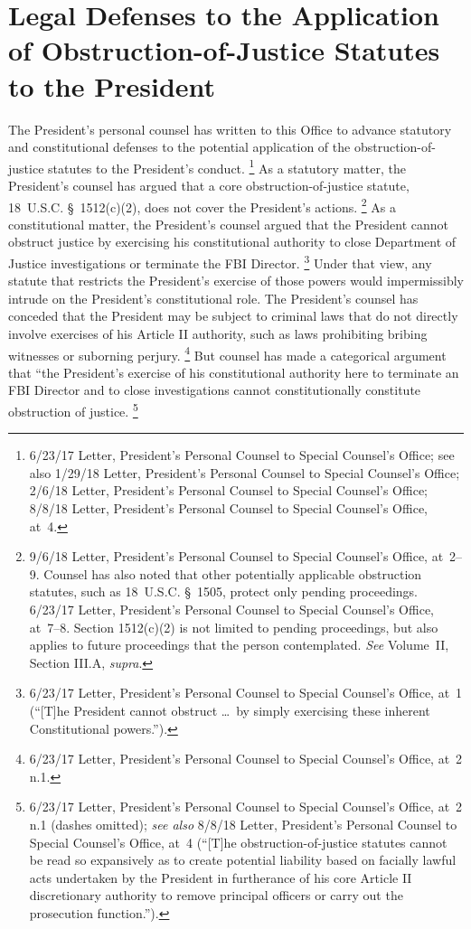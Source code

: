 \section{Legal Defenses to the Application of Obstruction-of-Justice Statutes to the President}

The President's personal counsel has written to this Office to advance statutory and constitutional defenses to the potential application of the obstruction-of-justice statutes to the President's conduct.%
\footnote{6/23/17 Letter, President's Personal Counsel to Special Counsel's Office;
see also 1/29/18 Letter, President's Personal Counsel to Special Counsel's Office;
2/6/18 Letter, President's Personal Counsel to Special Counsel's Office;
8/8/18 Letter, President's Personal Counsel to Special Counsel's Office, at~4.}
As a statutory matter, the President's counsel has argued that a core obstruction-of-justice statute, 18~U.S.C. \S~1512(c)(2), does not cover the President's actions.%
\footnote{9/6/18 Letter, President's Personal Counsel to Special Counsel's Office, at~2--9.
Counsel has also noted that other potentially applicable obstruction statutes, such as 18~U.S.C. \S~1505, protect only pending proceedings.
6/23/17 Letter, President's Personal Counsel to Special Counsel's Office, at~7--8.
Section 1512(c)(2) is not limited to pending proceedings, but also applies to future proceedings that the person contemplated.
\textit{See} Volume~II, Section III.A, \textit{supra}.}
As a constitutional matter, the President's counsel argued that the President cannot obstruct justice by exercising his constitutional authority to close Department of Justice investigations or terminate the FBI Director.%
\footnote{6/23/17 Letter, President's Personal Counsel to Special Counsel's Office, at~1 (``[T]he President cannot obstruct \dots\ by simply exercising these inherent Constitutional powers.'').}
Under that view, any statute that restricts the President's exercise of those powers would impermissibly intrude on the President's constitutional role.
The President's counsel has conceded that the President may be subject to criminal laws that do not directly involve exercises of his Article II authority, such as laws prohibiting bribing witnesses or suborning perjury.%
\footnote{6/23/17 Letter, President's Personal Counsel to Special Counsel's Office, at~2 n.1.}
But counsel has made a categorical argument that ``the President's exercise of his constitutional authority here to terminate an FBI Director and to close investigations cannot constitutionally constitute obstruction of justice.%
\footnote{6/23/17 Letter, President's Personal Counsel to Special Counsel's Office, at~2 n.1 (dashes omitted);
\textit{see also} 8/8/18 Letter, President's Personal Counsel to Special Counsel's Office, at~4 (``[T]he obstruction-of-justice statutes cannot be read so expansively as to create potential liability based on facially lawful acts undertaken by the President in furtherance of his core Article II discretionary authority to remove principal officers or carry out the prosecution function.'').}

